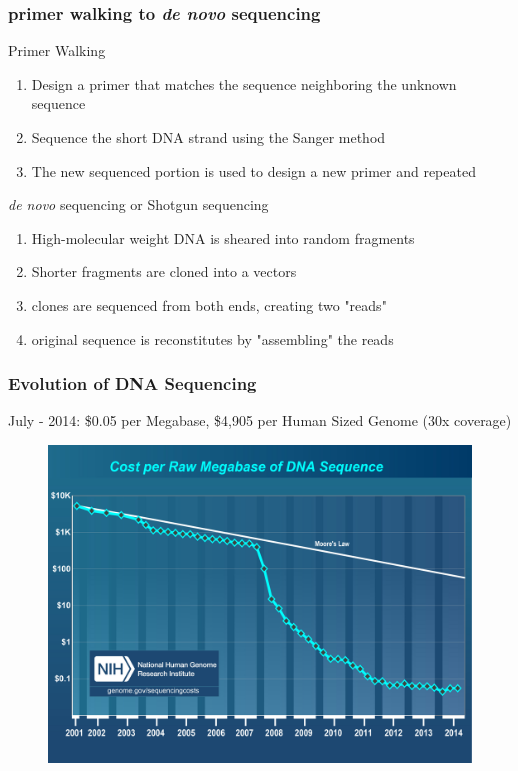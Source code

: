 \documentclass{beamer}
\begin{document}
\begin{frame}
  \frametitle{primer walking to \textit{de novo} sequencing}
Primer Walking
  \begin{enumerate}
  \item Design a primer that matches the sequence neighboring the unknown sequence
  \item Sequence the short DNA strand using the Sanger method
  \item The new sequenced portion is used to design a new primer and repeated
\end{enumerate}
\textit{de novo} sequencing or Shotgun sequencing
  \begin{enumerate}
  \item High-molecular weight DNA is sheared into random fragments
  \item Shorter fragments are cloned into a vectors
  \item clones are sequenced from both ends, creating two "reads"
  \item original sequence is reconstitutes by "assembling" the reads 
\end{enumerate}
\end{frame}



\begin{frame}
  \frametitle{Evolution of DNA Sequencing}
  {\footnotesize July - 2014: \$0.05 per Megabase, \$4,905 per Human Sized Genome (30x coverage)}
  \begin{center}
  \begin{figure}
    \includegraphics[scale=0.4]{cost_per_megabase.jpg}
  \end{figure}
  \end{center}
\end{frame}
\end{document}
